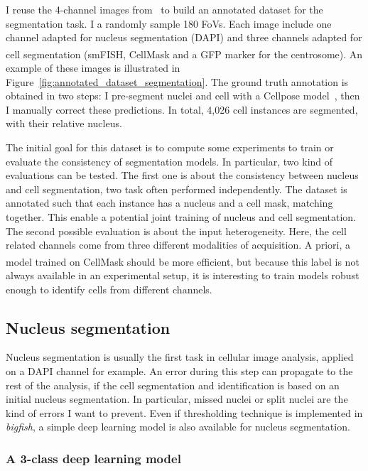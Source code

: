 I reuse the 4-channel images from~\cite{safieddine_choreography_2021} to build an annotated dataset for the segmentation task.
I a randomly sample 180 \ac{FoV}s.
Each image include one channel adapted for nucleus segmentation (DAPI) and three channels adapted for cell segmentation (\ac{smFISH}, CellMask\textsuperscript{\texttrademark} and a \ac{GFP} marker for the centrosome).
An example of these images is illustrated in Figure~\ref{fig:annotated_dataset_segmentation}.
The ground truth annotation is obtained in two steps: I pre-segment nuclei and cell with a Cellpose model~\cite{stringer_cellpose_2021}, then I manually correct these predictions.
In total, 4,026 cell instances are segmented, with their relative nucleus.

The initial goal for this dataset is to compute some experiments to train or evaluate the consistency of segmentation models.
In particular, two kind of evaluations can be tested.
The first one is about the consistency between nucleus and cell segmentation, two task often performed independently.
The dataset is annotated such that each instance has a nucleus and a cell mask, matching together.
This enable a potential joint training of nucleus and cell segmentation.
The second possible evaluation is about the input heterogeneity.
Here, the cell related channels come from three different modalities of acquisition.
A priori, a model trained on CellMask\textsuperscript{\texttrademark} should be more efficient, but because this label is not always available in an experimental setup, it is interesting to train models robust enough to identify cells from different channels.

\subsection{Nucleus segmentation}
\label{subsec:segmentation_nuc}

Nucleus segmentation is usually the first task in cellular image analysis, applied on a DAPI channel for example.
An error during this step can propagate to the rest of the analysis, if the cell segmentation and identification is based on an initial nucleus segmentation.
In particular, missed nuclei or split nuclei are the kind of errors I want to prevent.
Even if thresholding technique is implemented in \emph{bigfish}, a simple deep learning model is also available for nucleus segmentation.

\subsubsection{A 3-class deep learning model}

